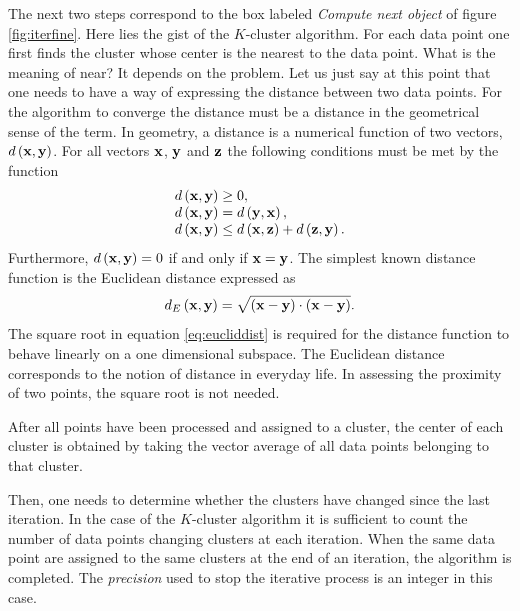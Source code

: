 \documentclass[twoside]{book}
\begin{document}
The next two steps correspond to the box labeled {\sl Compute next
object} of figure \ref{fig:iterfine}. Here lies the gist of the
$K$-cluster algorithm. For each data point one first finds the
cluster whose center is the nearest to the data point. What is the
meaning of near? It depends on the problem. Let us just say at
this point that one needs to have a way of expressing the distance
between two data points. For the algorithm to converge the
distance must be a distance in the geometrical sense of the term.
In geometry, a distance is a numerical function of two vectors,
$d\left({\bf x},{\bf y}\right)$. For all vectors ${\bf x}$, ${\bf
y}$ and ${\bf z}$ the following conditions must be met by the
function
\begin{equation}
\nonumber
\begin{array}{l}
 d\left({\bf x},{\bf y}\right) \geq 0, \\
 d\left({\bf x},{\bf y}\right) = d\left({\bf y},{\bf x}\right), \\
 d\left({\bf x},{\bf y}\right) \leq d\left({\bf x},{\bf z}\right)
 + d\left({\bf z},{\bf y}\right).
\end{array}
\end{equation}
Furthermore, $d\left({\bf x},{\bf y}\right)=0$ if and only if
${\bf x}={\bf y}$. The simplest known distance function is the
Euclidean distance expressed as
\begin{equation}
\label{eq:eucliddist}
 d_E\left({\bf x},{\bf y}\right) = \sqrt{\left({\bf x}-{\bf y}\right)\cdot\left({\bf x}-{\bf
 y}\right)}.
\end{equation}
The square root in equation \ref{eq:eucliddist} is required for
the distance function to behave linearly on a one dimensional
subspace. The Euclidean distance corresponds to the notion of
distance in everyday life. In assessing the proximity of two
points, the square root is not needed.

After all points have been processed and assigned to a cluster,
the center of each cluster is obtained by taking the vector
average of all data points belonging to that cluster.

Then, one needs to determine whether the clusters have changed
since the last iteration. In the case of the $K$-cluster algorithm
it is sufficient to count the number of data points changing
clusters at each iteration. When the same data point are assigned
to the same clusters at the end of an iteration, the algorithm is
completed. The {\sl precision} used to stop the iterative process
is an integer in this case.
\end{document}
